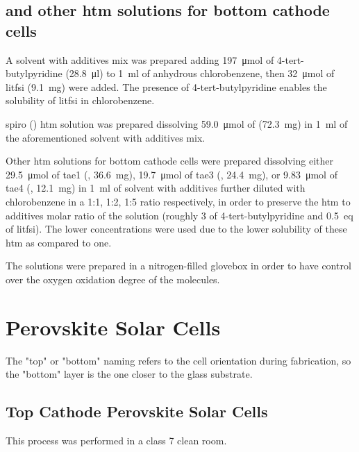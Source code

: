 	\subsection{\Spiro and other \gls{htm} solutions for bottom cathode cells}

		A solvent with additives mix was prepared adding \SI{197}{\umol} of 4-tert-butylpyridine (\SI{28.8}{\ul}) to \SI{1}{\ml} of anhydrous chlorobenzene, then \SI{32}{\umol} of \gls{litfsi} (\SI{9.1}{\mg}) were added. The presence of 4-tert-butylpyridine enables the solubility of \gls{litfsi} in chlorobenzene.

		\Glsdesc{spiro} (\spiro) \gls{htm} solution was prepared dissolving \SI{59.0}{\umol} of \spiro (\SI{72.3}{\mg}) in \SI{1}{\ml} of the aforementioned solvent with additives mix.

		Other \gls{htm} solutions for bottom cathode cells were prepared dissolving either \SI{29.5}{\umol} of \glsdesc{tae1} (, \SI{36.6}{\mg}), \SI{19.7}{\umol} of \glsdesc{tae3} (, \SI{24.4}{\mg}), or \SI{9.83}{\umol} of \glsdesc{tae4} (, \SI{12.1}{\mg}) in \SI{1}{\ml} of solvent with additives further diluted with chlorobenzene in a 1:1, 1:2, 1:5 ratio respectively, in order to preserve the \gls{htm} to additives molar ratio of the \spiro solution (roughly \SI{3}{\eq} of 4-tert-butylpyridine and \SI{0.5}{eq} of \gls{litfsi}). The lower concentrations were used due to the lower solubility of these \gls{htm} as compared to \spiro one.

		The solutions were prepared in a nitrogen-filled glovebox in order to have control over the oxygen oxidation degree of the molecules.

\section{Perovskite Solar Cells}

	The "top" or "bottom" naming refers to the cell orientation during fabrication, so the "bottom" layer is the one closer to the glass substrate.

	\subsection{Top Cathode Perovskite Solar Cells}\label{methods_top}

			This process was performed in a class 7 clean room.

